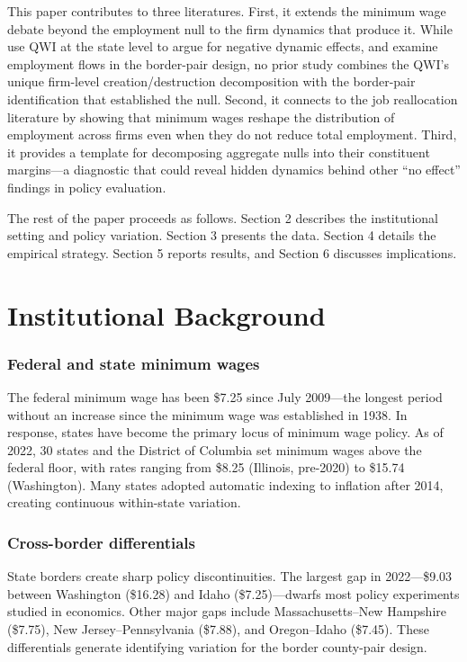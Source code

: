 \documentclass[12pt]{article}
\begin{document}
This paper contributes to three literatures. First, it extends the minimum wage debate beyond the employment null to the firm dynamics that produce it. While \citet{meer2016effects} use QWI at the state level to argue for negative dynamic effects, and \citet{dube2016minimum} examine employment flows in the border-pair design, no prior study combines the QWI's unique firm-level creation/destruction decomposition with the border-pair identification that established the null. Second, it connects to the job reallocation literature \citep{davis1992gross, davis1996job} by showing that minimum wages reshape the distribution of employment across firms even when they do not reduce total employment. Third, it provides a template for decomposing aggregate nulls into their constituent margins---a diagnostic that could reveal hidden dynamics behind other ``no effect'' findings in policy evaluation.

The rest of the paper proceeds as follows. Section 2 describes the institutional setting and policy variation. Section 3 presents the data. Section 4 details the empirical strategy. Section 5 reports results, and Section 6 discusses implications.


\section{Institutional Background}

\subsubsection*{Federal and state minimum wages} The federal minimum wage has been \$7.25 since July 2009---the longest period without an increase since the minimum wage was established in 1938. In response, states have become the primary locus of minimum wage policy. As of 2022, 30 states and the District of Columbia set minimum wages above the federal floor, with rates ranging from \$8.25 (Illinois, pre-2020) to \$15.74 (Washington). Many states adopted automatic indexing to inflation after 2014, creating continuous within-state variation.

\subsubsection*{Cross-border differentials} State borders create sharp policy discontinuities. The largest gap in 2022---\$9.03 between Washington (\$16.28) and Idaho (\$7.25)---dwarfs most policy experiments studied in economics. Other major gaps include Massachusetts--New Hampshire (\$7.75), New Jersey--Pennsylvania (\$7.88), and Oregon--Idaho (\$7.45). These differentials generate identifying variation for the border county-pair design.
\end{document}
